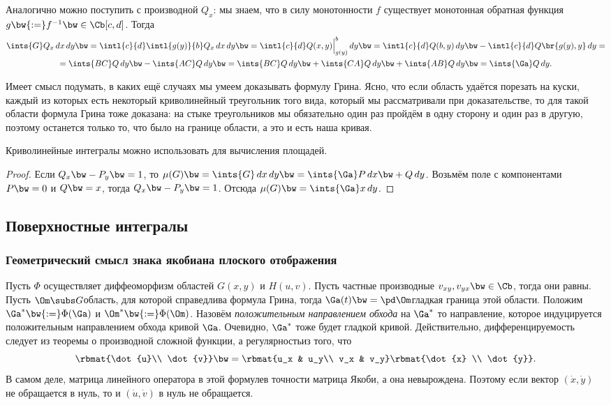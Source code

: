 \documentclass[a4paper]{article}
\begin{document}
Аналогично можно поступить с производной $Q_x$: мы знаем, что в силу монотонности $f$ существует монотонная
обратная функция $g \bw{:=} f^{-1} \bw\in \Cb[c,d]$. Тогда
\begin{multline*}
\ints{G}Q_x\,dx\,dy \bw=
\intl{c}{d}\intl{g(y)}{b}Q_x\,dx \,dy\bw= \intl{c}{d}Q(x,y)\Bigl\rvert_{g(y)}^b\,d y \bw=
\intl{c}{d}Q(b,y)\,d y \bw- \intl{c}{d}Q\br{g(y),y}\,d y =\\=
\ints{BC}Q\,d y \bw-\ints{AC}Q\,d y\bw=\ints{BC}Q\,d y \bw+ \ints{CA}Q\,d y \bw+
\ints{A B}Q\,dy \bw= \ints{\Ga}Q\,dy.
\end{multline*}

Имеет смысл подумать, в каких ещё случаях мы умеем доказывать формулу Грина. Ясно, что если область
удаётся порезать на куски, каждый из которых есть некоторый криволинейный треугольник того вида,
который мы рассматривали при доказательстве, то для такой области формула Грина тоже доказана: на
стыке треугольников мы обязательно один раз пройдём в одну сторону и один раз в другую, поэтому
останется только то, что было на границе области, а это и есть наша кривая.

\begin{imp}
Криволинейные интегралы можно использовать для вычисления площадей.
\end{imp}
\begin{proof}
Если $Q_x\bw-P_y\bw=1$, то $\mu(G) \bw= \ints{G} \,dx \,dy \bw= \ints{\Ga}P\,dx \bw+ Q \,dy$. Возьмём
поле с компонентами $P \bw= 0$ и $Q \bw= x$, тогда $Q_x \bw- P_y\bw=1$. Отсюда
$\mu(G) \bw= \ints{\Ga}x \,dy$.
\end{proof}

\subsection{Поверхностные интегралы}

\subsubsection{Геометрический смысл знака якобиана плоского отображения}

Пусть $\Phi$ осуществляет диффеоморфизм областей $G(x,y)$ и $H(u,v)$. Пусть частные производные
$v_{xy}, v_{yx} \bw\in \Cb$, тогда они равны. Пусть $\Om \subs G$\т область, для которой справедлива
формула Грина, тогда $\Ga(t) \bw= \pd \Om$\т гладкая граница этой области. Положим $\Ga^* \bw{:=}
\Phi(\Ga)$ и $\Om^* \bw{:=} \Phi(\Om)$. Назовём \emph{положительным направлением обхода} на $\Ga^*$
то направление, которое индуцируется положительным направлением обхода кривой $\Ga$. Очевидно,
$\Ga^*$ тоже будет гладкой кривой. Действительно, дифференцируемость следует из теоремы о
производной сложной функции, а регулярность\т из того, что
$$\rbmat{\dot{u}\\ \dot{v}}\bw= \rbmat{u_x & u_y\\ v_x & v_y}\rbmat{\dot{x} \\ \dot{y}}.$$
В самом деле, матрица линейного оператора в этой формуле\т в точности матрица Якоби, а она
невырождена. Поэтому если вектор $(\dot x,\dot y)$ не обращается в нуль, то и $(\dot u, \dot v)$ в
нуль не обращается.
\end{document}
